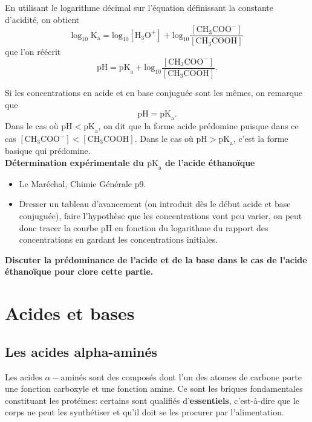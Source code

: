 \documentclass[11pt,a4paper]{report}
\begin{document}
En utilisant le logarithme décimal sur l'équation définissant la constante d'acidité, on obtient
\begin{equation}
	\text{log}_{10}\;\text{K}_\text{a} = \text{log}_{10}[\text{H}_3\text{O}^+] 
	+ \text{log}_{10}\frac{[\text{CH}_3\text{COO}^-]}{[\text{CH}_3\text{COOH}]}
\end{equation}
que l'on réécrit
\begin{equation}
	\text{pH} = \text{pK}_\text{a} 
	+ \text{log}_{10}\frac{[\text{CH}_3\text{COO}^-]}{[\text{CH}_3\text{COOH}]}.
\end{equation}

Si les concentrations en acide et en base conjuguée sont les mêmes, on remarque que 
\begin{equation}
	\text{pH} = \text{pK}_\text{a}. 
\end{equation}
Dans le cas où $\text{pH} < \text{pK}_\text{a}$, on dit que la forme acide prédomine puisque dans ce cas $[\text{CH}_3\text{COO}^-] < [\text{CH}_3\text{COOH}]$. Dans le cas où $\text{pH} > \text{pK}_\text{a}$, c'est la forme basique qui prédomine.\\

\newpage
\textbf{Détermination expérimentale du $\text{pK}_\text{a}$ de l'acide éthanoïque}
\begin{itemize}
	\item Le Maréchal, Chimie Générale p9.
	\item Dresser un tableau d'avancement (on introduit dès le début acide et base conjuguée), faire l'hypothèse que les concentrations vont peu varier, on peut donc tracer la courbe pH en fonction du logarithme du rapport des concentrations en gardant les concentrations initiales.\\ 
\end{itemize}

\textbf{Discuter la prédominance de l'acide et de la base dans le cas de l'acide éthanoïque pour clore cette partie.}

\section{Acides et bases}

\subsection{Les acides alpha-aminés}

Les acides $\alpha-$aminés sont des composés dont l'un des atomes de carbone porte une fonction carboxyle et une fonction amine. Ce sont les briques fondamentales constituant les protéines: certains sont qualifiés d'\textbf{essentiels}, c'est-à-dire que le corps ne peut les synthétiser et qu'il doit se les procurer par l'alimentation.\\
\end{document}
